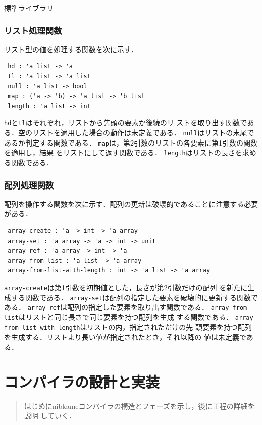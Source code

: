 \documentclass[a4paper,titlepage,report,disablejfam]{jsbook}
\begin{document}
\begin{resbonsiblesection}{標準ライブラリ}{\kobori}
\subsection{リスト処理関数}
リスト型の値を処理する関数を次に示す．
\begin{lstlisting}
 hd : 'a list -> 'a
 tl : 'a list -> 'a list
 null : 'a list -> bool
 map : ('a -> 'b) -> 'a list -> 'b list
 length : 'a list -> int
\end{lstlisting}
\lstinline|hd|と\lstinline|tl|はそれぞれ，リストから先頭の要素か後続のリ
ストを取り出す関数である．空のリストを適用した場合の動作は未定義である．
\lstinline|null|はリストの末尾であるか判定する関数である．
\lstinline|map|は，第2引数のリストの各要素に第1引数の関数を適用し，結果
をリストにして返す関数である．
\lstinline|length|はリストの長さを求める関数である．

\subsection{配列処理関数}
配列を操作する関数を次に示す．配列の更新は破壊的であることに注意する必要
がある．
\begin{lstlisting}
 array-create : 'a -> int -> 'a array
 array-set : 'a array -> 'a -> int -> unit
 array-ref : 'a array -> int -> 'a
 array-from-list : 'a list -> 'a array
 array-from-list-with-length : int -> 'a list -> 'a array
\end{lstlisting}
\lstinline|array-create|は第1引数を初期値とした，長さが第2引数だけの配列
を新たに生成する関数である．
\lstinline|array-set|は配列の指定した要素を破壊的に更新する関数である．
\lstinline|array-ref|は配列の指定した要素を取り出す関数である．
\lstinline|array-from-list|はリストと同じ長さで同じ要素を持つ配列を生成
する関数である．
\lstinline|array-from-list-with-length|はリストの内，指定されただけの先
頭要素を持つ配列を生成する．リストより長い値が指定されたとき，それ以降の%
値は未定義である．

\end{resbonsiblesection}

\chapter{コンパイラの設計と実装}\label{ch:impl}

\begin{abstract}
はじめにnibkameコンパイラの構造とフェーズを示し，後に工程の詳細を説明
していく．
\end{abstract}
\end{document}
